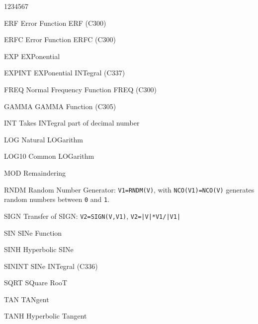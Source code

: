 {\begin{DLttc}{1234567}
\item[ERF]     Error Function ERF (C300)
\item[ERFC]    Error Function ERFC (C300)
\item[EXP]     EXPonential
\item[EXPINT]  EXPonential INTegral (C337)
\item[FREQ]    Normal Frequency Function FREQ (C300)
\item[GAMMA]   GAMMA Function (C305)
\item[INT]     Takes INTegral part of decimal number
\item[LOG]     Natural LOGarithm
\item[LOG10]   Common LOGarithm
\item[MOD]     Remaindering
\item[RNDM]    Random Number Generator: \texttt{V1=RNDM(V)}, with
               \texttt{NCO(V1)=NCO(V)} generates random numbers 
               between \texttt{0} and \texttt{1}.
\item[SIGN]    Transfer of SIGN: \texttt{V2=SIGN(V,V1)}, 
               \texttt{V2=|V|*V1/|V1|}
\item[SIN]     SINe Function
\item[SINH]    Hyperbolic SINe
\item[SININT]  SINe INTegral (C336)
\item[SQRT]    SQuare RooT
\item[TAN]     TANgent
\item[TANH]    Hyperbolic Tangent
\end{DLttc}
}%
{}
